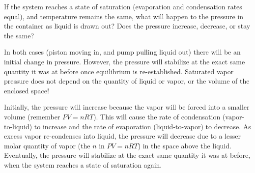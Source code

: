 If the system reaches a state of saturation (evaporation and condensation rates equal), and temperature remains the same, what will happen to the pressure in the container as liquid is drawn out?  Does the pressure increase, decrease, or stay the same?







In both cases (piston moving in, and pump pulling liquid out) there will be an initial change in pressure.  However, the pressure will stabilize at the exact same quantity it was at before once equilibrium is re-established.  Saturated vapor pressure does not depend on the quantity of liquid or vapor, or the volume of the enclosed space!

Initially, the pressure will increase because the vapor will be forced into a smaller volume (remember $PV = nRT$).  This will cause the rate of condensation (vapor-to-liquid) to increase and the rate of evaporation (liquid-to-vapor) to decrease.  As excess vapor re-condenses into liquid, the pressure will decrease due to a lesser molar quantity of vapor (the $n$ in $PV = nRT$) in the space above the liquid.  Eventually, the pressure will stabilize at the exact same quantity it was at before, when the system reaches a state of saturation again.  










